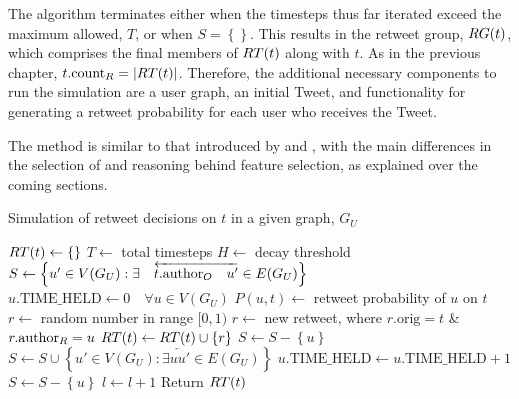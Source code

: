 The algorithm terminates either when the timesteps thus far iterated exceed the maximum allowed, $T$, or when $S = \left\{\right\}$. This results in the retweet group, $RG(t)$, which comprises the final members of $RT(t)$ along with $t$. As in the previous chapter, $t.\textrm{count}_R = |RT(t)|$. Therefore, the additional necessary components to run the simulation are a user graph, an initial Tweet, and functionality for generating a retweet probability for each user who receives the Tweet.

The method is similar to that introduced by \citet{zhu11} and \citet{peng11}, with the main differences in the selection of and reasoning behind feature selection, as explained over the coming sections.

\begin{algorithm}
\caption{Simulation of retweet decisions on $t$ in a given graph, $G_U$}
\begin{algorithmic}[1]
    \State $RT(t)\gets \left\{\right\}$
    \State $T\gets$ total timesteps
    \State $H\gets$ decay threshold 
    \State $S\gets \left\{u' \in V(G_U) : \exists \quad \overleftarrow{t.\textrm{author}_O \quad u'} \in E(G_U)\right\}$
    \State $u.\textrm{TIME\_HELD}\gets 0 \quad \forall u \in V(G_U)$
    \Statex %
            \State $P(u,t)\gets$ retweet probability of $u$ on $t$
            \State $r\gets$ random number in range $[0,1)$
                \State $r\gets$ new retweet, where $r.\textrm{orig} = t$ \& $r.\textrm{author}_R = u$
                \State $RT(t)\gets RT(t) \cup \left\{r\right\}$
                \State $S\gets S - \left\{u\right\}$
                \State $S\gets S \cup \left\{u' \in V(G_U) : \exists \overleftarrow{u u'} \in E(G_U)\right\}$
            \Else
                \State $u.\textrm{TIME\_HELD}\gets u.\textrm{TIME\_HELD} + 1$
                    \State $S\gets S - \left\{u\right\}$ 
                \EndIf
            \EndIf
        \EndFor
        \State $l\gets l + 1$
    \EndWhile
    \State Return $RT(t)$
\EndProcedure
\end{algorithmic}
\label{algo1}
\end{algorithm}


